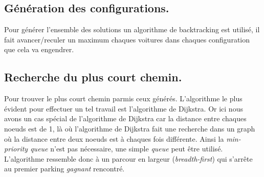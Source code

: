 \documentclass[10pt, a4paper]{article}
\begin{document}

\subsection{Génération des configurations.}
    Pour générer l'ensemble des solutions un algorithme de backtracking est
    utilisé, il fait avancer/reculer un maximum chaques voitures dans chaques
    configuration que cela va engendrer.
\subsection{Recherche du plus court chemin.}
    Pour trouver le plus court chemin parmis ceux générés. L'algorithme le plus
    évident pour effectuer un tel travail est l'algorithme de Dijkstra.
    Or ici nous avons un cas spécial de
    l'algorithme de Dijkstra car la distance entre chaques noeuds est de 1, là
    où l'algorithme de Dijkstra fait une recherche dans un graph où
    la distance entre deux noeuds est à chaques fois différente.
    Ainsi la \emph{min-priority queue} n'est pas nécessaire, une simple
    \emph{queue} peut être utilisé.
    L'algorithme ressemble donc à un parcour en largeur (\emph{breadth-first})
    qui s'arrête au premier parking \emph{gagnant} rencontré. \newline
\end{document}
